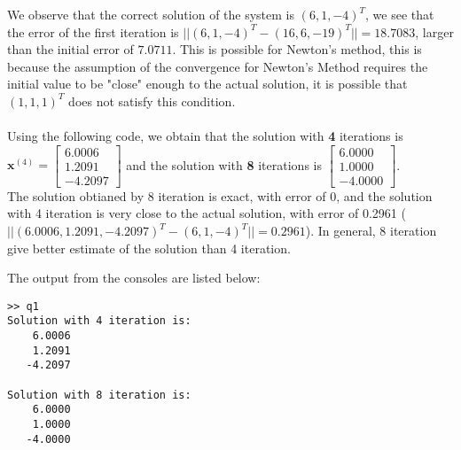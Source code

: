 \documentclass[11pt]{article}
\begin{document}
We observe that the correct solution of the system is $(6,1,-4)^T$, we see that the error of the first iteration is $||(6,1,-4)^T-(16,6,-19)^T ||= 18.7083$, larger than the initial error of $7.0711$. This is possible for Newton's method, this is because the assumption of the convergence for Newton's Method requires the initial value to be "close" enough to the actual solution, it is possible that $(1,1,1)^T$ does not satisfy this condition.\\\\
Using the following code, we obtain that the solution with \textbf{4} iterations is
$ \mathbf{x}^{(4)} = \begin{bmatrix}
6.0006\\1.2091\\-4.2097
\end{bmatrix}$ and the solution with \textbf{8} iterations is  $\begin{bmatrix}
6.0000\\1.0000\\-4.0000
\end{bmatrix}$. \\The solution obtianed by 8 iteration is exact, with error of 0, and the solution with 4 iteration is very close to the actual solution, with error of 0.2961 ($ ||(6.0006,1.2091,-4.2097)^T - (6,1,-4)^T || = 0.2961 $). In general, 8 iteration give better estimate of the solution than 4 iteration.

The output from the consoles are listed below:
\begin{verbatim}
>> q1
Solution with 4 iteration is:
    6.0006
    1.2091
   -4.2097

Solution with 8 iteration is:
    6.0000
    1.0000
   -4.0000
\end{verbatim}
\end{document}
